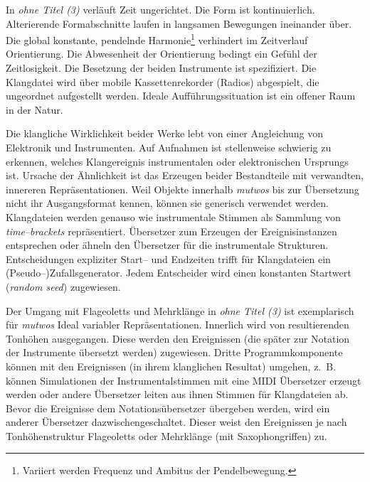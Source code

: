 \documentclass[12pt,a4paper,ngerman]{article}
\begin{document}
\smallskip

In \emph{ohne Titel (3)} verläuft Zeit ungerichtet.
Die Form ist kontinuierlich.
Alterierende Formabschnitte laufen in langsamen Bewegungen ineinander über.
Die global konstante, pendelnde Harmonie\footnote{%
    Variiert werden Frequenz und Ambitus der Pendelbewegung.
} verhindert im Zeitverlauf Orientierung.
Die Abwesenheit der Orientierung bedingt ein Gefühl der Zeitlosigkeit.
Die Besetzung der beiden Instrumente ist spezifiziert.
Die Klangdatei wird über mobile Kassettenrekorder (Radios) abgespielt, die ungeordnet aufgestellt werden.
Ideale Aufführungssituation ist ein offener Raum in der Natur.

\bigskip

Die klangliche Wirklichkeit beider Werke lebt von einer Angleichung von Elektronik und Instrumenten.
Auf Aufnahmen ist stellenweise schwierig zu erkennen, welches Klangereignis instrumentalen oder elektronischen Ursprungs ist.
Ursache der Ähnlichkeit ist das Erzeugen beider Bestandteile mit verwandten, innereren Repräsentationen.
Weil Objekte innerhalb \emph{mutwos} bis zur Übersetzung nicht ihr Ausgangsformat kennen, können sie generisch verwendet werden.
Klangdateien werden genauso wie instrumentale Stimmen als Sammlung von \emph{time--brackets} repräsentiert.
Übersetzer zum Erzeugen der Ereignisinstanzen entsprechen oder ähneln den Übersetzer für die instrumentale Strukturen.
Entscheidungen expliziter Start-- und Endzeiten trifft für Klangdateien ein (Pseudo--)Zufallsgenerator.
Jedem Entscheider wird einen konstanten Startwert (\emph{random seed}) zugewiesen.

\bigskip

Der Umgang mit Flageoletts und Mehrklänge in \emph{ohne Titel (3)} ist exemplarisch für \emph{mutwos} Ideal variabler Repräsentationen.
Innerlich wird von resultierenden Tonhöhen ausgegangen.
Diese werden den Ereignissen (die später zur Notation der Instrumente übersetzt werden) zugewiesen.
Dritte Programmkomponente können mit den Ereignissen (in ihrem klanglichen Resultat) umgehen, z.~B. können Simulationen der Instrumentalstimmen mit eine MIDI Übersetzer erzeugt werden oder andere Übersetzer leiten aus ihnen Stimmen für Klangdateien ab.
Bevor die Ereignisse dem Notationsübersetzer übergeben werden, wird ein anderer Übersetzer dazwischengeschaltet.
Dieser weist den Ereignissen je nach Tonhöhenstruktur Flageoletts oder Mehrklänge (mit Saxophongriffen) zu.

\smallskip
\end{document}

